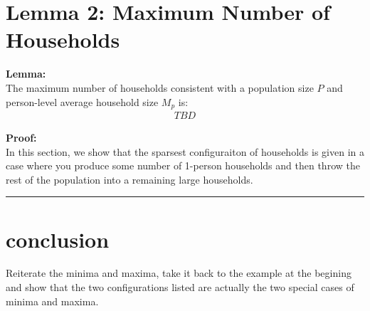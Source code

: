 \documentclass[
]{article}
\begin{document}
\hypertarget{lemma-2-maximum-number-of-households}{%
\section{Lemma 2: Maximum Number of
Households}\label{lemma-2-maximum-number-of-households}}

\textbf{Lemma:}\\
The maximum number of households consistent with a population size \(P\)
and person-level average household size \(M_p\) is: \begin{align}
TBD
\end{align}

\textbf{Proof:}\\
In this section, we show that the sparsest configuraiton of households
is given in a case where you produce some number of 1-person households
and then throw the rest of the population into a remaining large
households.

\begin{center}\rule{0.5\linewidth}{0.5pt}\end{center}

\hypertarget{conclusion}{%
\section{conclusion}\label{conclusion}}

Reiterate the minima and maxima, take it back to the example at the
begining and show that the two configurations listed are actually the
two special cases of minima and maxima.
\end{document}
